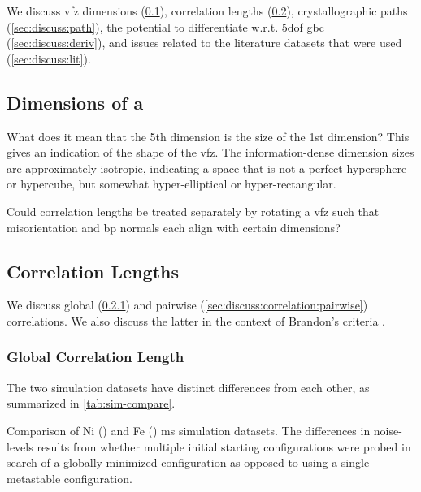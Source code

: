 \documentclass[final,twocolumn,12pt]{elsarticle}
\begin{document}
	We discuss \gls{vfz} dimensions (\cref{sec:discuss:dimensions}), correlation lengths (\cref{sec:discuss:correlation}), crystallographic paths (\cref{sec:discuss:path}), the potential to differentiate w.r.t. \gls{5dof} \gls{gbc} (\cref{sec:discuss:deriv}), and issues related to the literature datasets that were used (\cref{sec:discuss:lit}).
	
	\subsection{Dimensions of a } \label{sec:discuss:dimensions}
	What does it mean that the 5th dimension is \percFiveVsOne{} the size of the 1st dimension? This gives an indication of the shape of the \gls{vfz}. The information-dense dimension sizes are approximately isotropic, indicating a space that is not a perfect hypersphere or hypercube, but somewhat hyper-elliptical or hyper-rectangular.
	
	Could correlation lengths be treated separately by rotating a \gls{vfz} such that misorientation and \gls{bp} normals each align with certain dimensions?
	
	\subsection{Correlation Lengths} \label{sec:discuss:correlation}
    We discuss global (\cref{sec:discuss:correlation:global}) and pairwise (\cref{sec:discuss:correlation:pairwise}) correlations. We also discuss the latter in the context of Brandon's criteria \cite{REF}.

	\subsubsection{Global Correlation Length} \label{sec:discuss:correlation:global}
	The two simulation datasets have distinct differences from each other, as summarized in \cref{tab:sim-compare}.
	\begin{table}[htb!]
	    \centering
	    \caption{Comparison of Ni (\citet{olmstedSurveyComputedGrain2009}) and Fe (\citet{kimPhasefieldModeling3D2014}) \gls{ms} simulation datasets. The differences in noise-levels results from whether multiple initial starting configurations were probed in search of a globally minimized configuration as opposed to using a single metastable configuration. }
\label{tab:sim-compare}
	\end{table}
	
\end{document}
